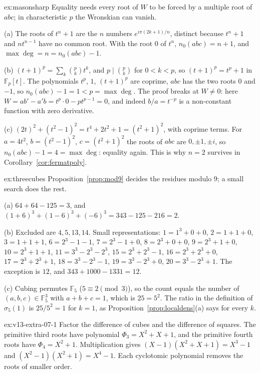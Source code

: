 \begin{solution}{ex:masonsharp}
\idea Equality needs every root of $W$ to be forced by a multiple root of $abc$; in characteristic $p$ the Wronskian can
vanish.

(a) The roots of $t^n+1$ are the $n$ numbers $e^{i\pi(2k+1)/n}$, distinct because $t^n+1$ and $nt^{n-1}$ have no common root.
With the root $0$ of $t^n$, $n_0(abc)=n+1$, and $\max\deg=n=n_0(abc)-1$.

(b) $(t+1)^p=\sum_k\binom pkt^k$, and $p\mid\binom pk$ for $0<k<p$, so $(t+1)^p=t^p+1$ in $\mathbb F_p[t]$. The polynomials
$t^p$, $1$, $(t+1)^p$ are coprime, $abc$ has the two roots $0$ and $-1$, so $n_0(abc)-1=1<p=\max\deg$. The proof breaks at
$W\ne0$: here $W=ab'-a'b=t^p\cdot0-pt^{p-1}=0$, and indeed $b/a=t^{-p}$ is a non-constant function with zero derivative.

(c) $(2t)^2+(t^2-1)^2=t^4+2t^2+1=(t^2+1)^2$, with coprime terms. For $a=4t^2$, $b=(t^2-1)^2$, $c=(t^2+1)^2$ the roots of
$abc$ are $0,\pm1,\pm i$, so $n_0(abc)-1=4=\max\deg$: equality again. This is why $n=2$ survives in
Corollary~\ref{cor:fermatpoly}.
\end{solution}

\begin{solution}{ex:threecubes}
\idea Proposition~\ref{prop:mod9} decides the residues modulo $9$; a small search does the rest.

(a) $64+64-125=3$, and $(1+6)^3+(1-6)^3+(-6)^3=343-125-216=2$.

(b) Excluded are $4,5,13,14$. Small representations: $1=1^3+0+0$, $2=1+1+0$, $3=1+1+1$, $6=2^3-1-1$, $7=2^3-1+0$,
$8=2^3+0+0$, $9=2^3+1+0$, $10=2^3+1+1$, $11=3^3-2^3-2^3$, $15=2^3+2^3-1$, $16=2^3+2^3+0$, $17=2^3+2^3+1$,
$18=3^3-2^3-1$, $19=3^3-2^3+0$, $20=3^3-2^3+1$. The exception is $12$, and $343+1000-1331=12$.

(c) Cubing permutes $\mathbb F_5$ ($5\equiv2\pmod3$), so the count equals the number of $(a,b,c)\in\mathbb F_5^3$ with
$a+b+c=1$, which is $25=5^2$. The ratio in the definition of $\sigma_5(1)$ is $25/5^2=1$ for $k=1$, as
Proposition~\ref{prop:localdens}(a) says for every $k$.
\end{solution}

\begin{solution}{ex:v13-extra-07-1}
\idea Factor the difference of cubes and the difference of squares.
\writeup The primitive third roots have polynomial $\Phi_3=X^2+X+1$, and the primitive fourth roots have $\Phi_4=X^2+1$. Multiplication gives $(X-1)(X^2+X+1)=X^3-1$ and $(X^2-1)(X^2+1)=X^4-1$. Each cyclotomic polynomial removes the roots of smaller order.
\end{solution}


